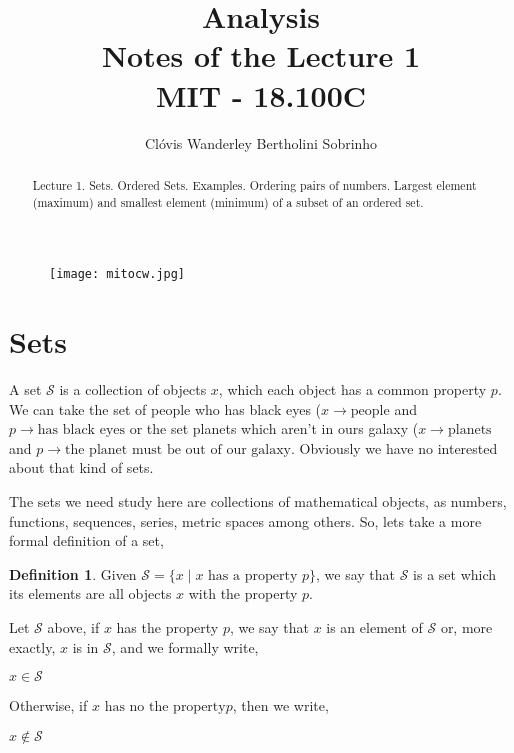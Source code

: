 \documentclass[11pt, a4paper]{amsart}
\title{Analysis\\Notes of the Lecture 1\\MIT - 18.100C}
\author{Clóvis Wanderley Bertholini Sobrinho}
\numberwithin{equation}{section}
\theoremstyle{plain} %
\theoremstyle{definition}
\newtheorem{defn}{Definition}[section]
\theoremstyle{remark}
\begin{document}
\begin{figure}[h]
\texttt{[image: mitocw.jpg]}
\end{figure}

\maketitle

\begin{abstract}
Lecture 1. Sets. Ordered Sets. Examples. Ordering pairs of numbers. Largest element (maximum) and smallest element (minimum) of a subset of an ordered set.
\end{abstract}

\section{Sets}

A set $\mathcal{S}$ is a collection of objects $x$, which each object has a common property $p$. 
We can take the set of people who has black eyes ($x\rightarrow\text{people}$ and $p\rightarrow\text{has black eyes}$ or the set planets which aren't in ours galaxy ($x\rightarrow\text{planets}$ and $p\rightarrow\text{the planet must be out of our galaxy}$. Obviously we have no interested about that kind of sets.

The sets we need study here are collections of mathematical objects, as numbers, functions, sequences, series, metric spaces among others. So, lets take a more formal definition of a set,

\begin{defn}
    Given $\mathcal{S}=\lbrace x\mid x \text{ has a property } p\rbrace$, we say that $\mathcal{S}$ is a set which its elements are all objects $x$ with the property $p$.
\end{defn}

Let $\mathcal{S}$ above, if $x$ has the property $p$, we say that $x$ is an element of $\mathcal{S}$ or, more exactly, $x$ is in $\mathcal{S}$, and we formally write,
\begin{center}
    $x\in\mathcal{S}$
\end{center}

Otherwise, if $x \text{ has no the property} p$, then we write,
\begin{center}
    $x\notin\mathcal{S}$
\end{center}
\end{document}
